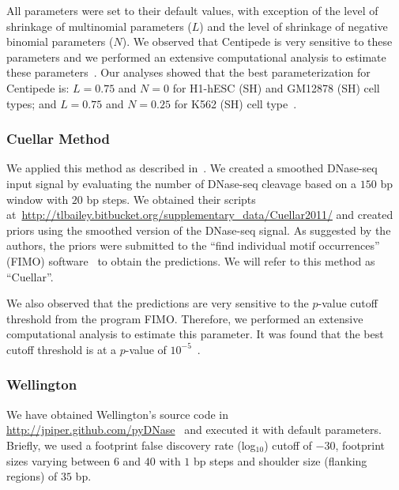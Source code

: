 All parameters were set to their default values, with exception of the level of shrinkage of multinomial parameters ($L$) and the level of shrinkage of negative binomial parameters ($N$). We observed that Centipede is very sensitive to these parameters and we performed an extensive computational analysis to estimate these parameters~\citep{gusmao2014}. Our analyses showed that the best parameterization for Centipede is: $L=0.75$ and $N=0$ for H1-hESC (SH) and GM12878 (SH) cell types; and $L=0.75$ and $N=0.25$ for K562 (SH) cell type~\citep{gusmao2014}.

\subsubsection{Cuellar Method}

We applied this method as described in~\cite{cuellar2012}. We created a smoothed DNase-seq input signal by evaluating the number of DNase-seq cleavage based on a $150$ bp window with $20$ bp steps. We obtained their scripts at~\url{http://tlbailey.bitbucket.org/supplementary_data/Cuellar2011/} and created priors using the smoothed version of the DNase-seq signal. As suggested by the authors, the priors were submitted to the ``find individual motif occurrences'' (FIMO) software~\citep{grant2011} to obtain the predictions. We will refer to this method as ``Cuellar''.

We also observed that the predictions are very sensitive to the $p$-value cutoff threshold from the program FIMO. Therefore, we performed an extensive computational analysis to estimate this parameter. It was found that the best cutoff threshold is at a $p$-value of $10^{-5}$~\citep{gusmao2014}.

\subsubsection{Wellington}

We have obtained Wellington's source code in \url{http://jpiper.github.com/pyDNase}~\citep{piper2013} and executed it with default parameters. Briefly, we used a footprint false discovery rate (log$_{10}$) cutoff of $-30$, footprint sizes varying between $6$ and $40$ with $1$ bp steps and shoulder size (flanking regions) of $35$ bp.

